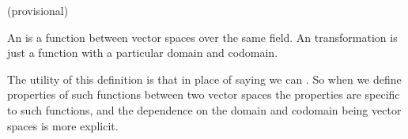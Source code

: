 
\sbasic



















\sstart
{}


(provisional)

An  is a function between vector spaces over the same field.
An transformation is just a function with a particular domain and codomain.

The utility of this definition is that in place of saying  we can .
So when we define properties of such functions between two vector spaces the properties are specific to such functions, and the dependence on the domain and codomain being vector spaces is more explicit.
\strats
